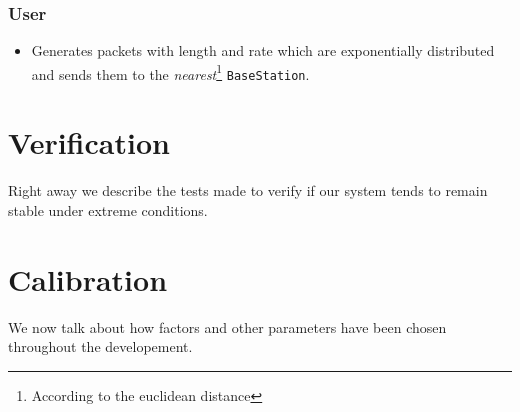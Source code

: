 \documentclass{article}
\begin{document}
\subsubsection{User}
\begin{itemize}
    \item Generates packets with length and rate which are exponentially distributed and sends them to the \textit{nearest}\footnote{According to the euclidean distance}
    \texttt{BaseStation}.
\end{itemize}

\newpage
\section{Verification}
Right away we describe the tests made to verify if our system tends to remain stable under extreme conditions.

\section{Calibration}
We now talk about how factors and other parameters have been chosen throughout the developement.
\end{document}
